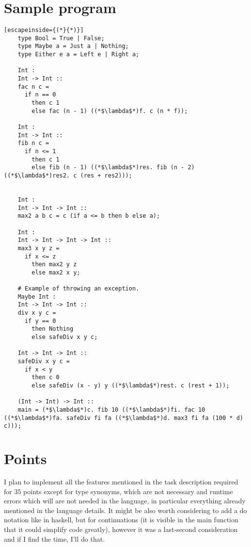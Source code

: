 \documentclass{article}
\begin{document}
	\section{Sample program}
	\begin{lstlisting}[escapeinside={(*}{*)}]
	type Bool = True | False;
	type Maybe a = Just a | Nothing;
	type Either e a = Left e | Right a;
	
	Int :
	Int -> Int ::
	fac n c =
	  if n == 0
	    then c 1
		else fac (n - 1) ((*$\lambda$*)f. c (n * f));
	
	Int :
	Int -> Int ::
	fib n c =
	  if n <= 1
		then c 1
		else fib (n - 1) ((*$\lambda$*)res. fib (n - 2) ((*$\lambda$*)res2. c (res + res2)));
	
	
	Int :
	Int -> Int -> Int ::
	max2 a b c = c (if a <= b then b else a);
	
	Int :
	Int -> Int -> Int -> Int ::
	max3 x y z =
	  if x <= z
		then max2 y z
		else max2 x y;
	
	# Example of throwing an exception.
	Maybe Int :
	Int -> Int -> Int ::
	div x y c = 
	  if y == 0 
	    then Nothing
	    else safeDiv x y c;
 
 	Int -> Int -> Int ::
 	safeDiv x y c = 
 	  if x < y
 	    then c 0
 	    else safeDiv (x - y) y ((*$\lambda$*)rest. c (rest + 1));
 	  
	(Int -> Int) -> Int ::
	main = (*$\lambda$*)c. fib 10 ((*$\lambda$*)fi. fac 10 ((*$\lambda$*)fa. safeDiv fi fa ((*$\lambda$*)d. max3 fi fa (100 * d) c)));
	\end{lstlisting}
	\section{Points}
	I plan to implement all the features mentioned in the task description required for 35 points except
	for type synonyms, which are not necessary and runtime errors which will are not needed in the language, in particular everything already mentioned in the language details. It might be also worth considering to add a do notation like in haskell, but for continuations (it is visible in the main function that it could simplify code greatly), however it was a last-second consideration and if I find the time, I'll do that.
\end{document}
